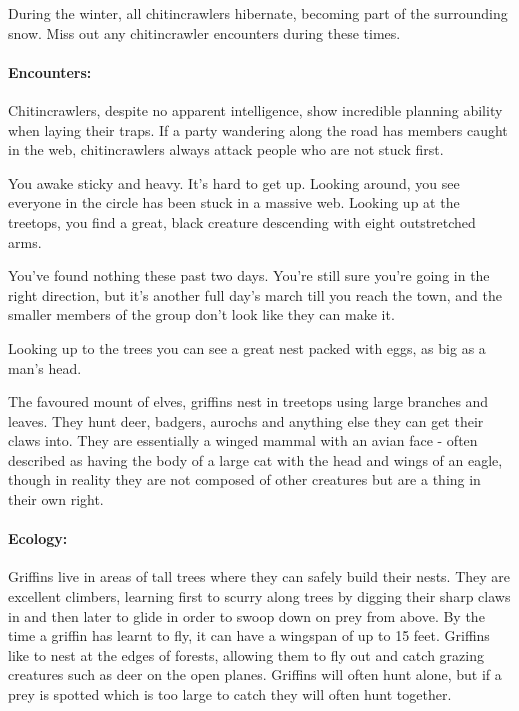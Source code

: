 \begin{multicols}{2}
During the winter, all chitincrawlers hibernate, becoming part of the surrounding snow.  Miss out any chitincrawler encounters during these times.

\paragraph{Encounters:} Chitincrawlers, despite no apparent intelligence, show incredible planning ability when laying their traps.  If a party wandering along the road has members caught in the web, chitincrawlers always attack people who are not stuck first.

\begin{boxtext}

You awake sticky and heavy.  It's hard to get up.  Looking around, you see everyone in the circle has been stuck in a massive web.  Looking up at the treetops, you find a great, black creature descending with eight outstretched arms.

\end{boxtext}

\label{griffin}

\griffin

\begin{boxtext}

	You've found nothing these past two days.  You're still sure you're going in the right direction, but it's another full day's march till you reach the town, and the smaller members of the group don't look like they can make it.

	Looking up to the trees you can see a great nest packed with eggs, as big as a man's head.

\end{boxtext}

The favoured mount of elves, griffins nest in treetops using large branches and leaves.  They hunt deer, badgers, aurochs and anything else they can get their claws into.  They are essentially a winged mammal with an avian face - often described as having the body of a large cat with the head and wings of an eagle, though in reality they are not composed of other creatures but are a thing in their own right.

\paragraph{Ecology:} Griffins live in areas of tall trees where they can safely build their nests.  They are excellent climbers, learning first to scurry along trees by digging their sharp claws in and then later to glide in order to swoop down on prey from above.  By the time a griffin has learnt to fly, it can have a wingspan of up to 15 feet.  Griffins like to nest at the edges of forests, allowing them to fly out and catch grazing creatures such as deer on the open planes.  Griffins will often hunt alone, but if a prey is spotted which is too large to catch  they will often hunt together.


\end{multicols}
